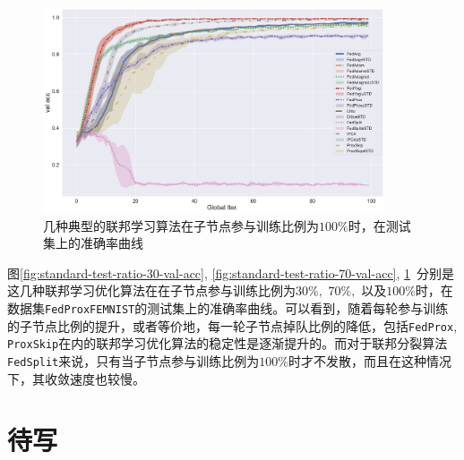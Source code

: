 \begin{figure}[ht]
    \centering
    \includegraphics[width=0.9\textwidth]{figures/standard-test-ratio-70-val-acc.pdf}
    \caption{几种典型的联邦学习算法在子节点参与训练比例为$100\%$时，在测试集上的准确率曲线}
    \label{fig:standard-test-ratio-100-val-acc}
\end{figure}

图\ref{fig:standard-test-ratio-30-val-acc}, \ref{fig:standard-test-ratio-70-val-acc}, \ref{fig:standard-test-ratio-100-val-acc}~分别是这几种联邦学习优化算法在在子节点参与训练比例为$30\%,$ $70\%,$ 以及$100\%$时，在数据集\texttt{FedProxFEMNIST}的测试集上的准确率曲线。可以看到，随着每轮参与训练的子节点比例的提升，或者等价地，每一轮子节点掉队比例的降低，包括\texttt{FedProx}, \texttt{ProxSkip}在内的联邦学习优化算法的稳定性是逐渐提升的。而对于联邦分裂算法\texttt{FedSplit}来说，只有当子节点参与训练比例为$100\%$时才不发散，而且在这种情况下，其收敛速度也较慢。


\section{待写}


